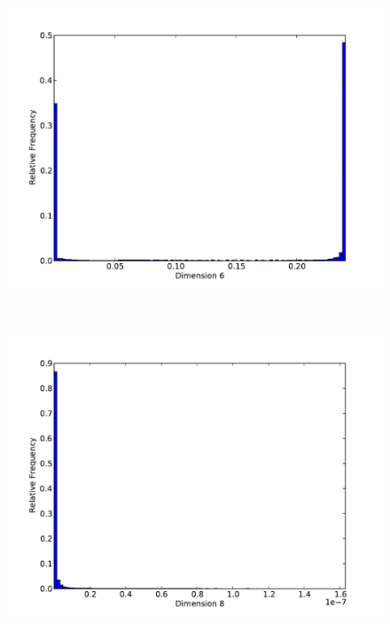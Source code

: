 \begin{figure}[h]
	\begin{center}
		\begin{subfloat}{%
			\includegraphics[scale=0.36]{figures/histograms/astrophysics_500000_5.pdf}
		}
		\end{subfloat}~
		\begin{subfloat}{%
			\includegraphics[scale=0.36]{figures/histograms/astrophysics_500000_7.pdf}
		}
		\end{subfloat}
	\end{center}
\end{figure}

